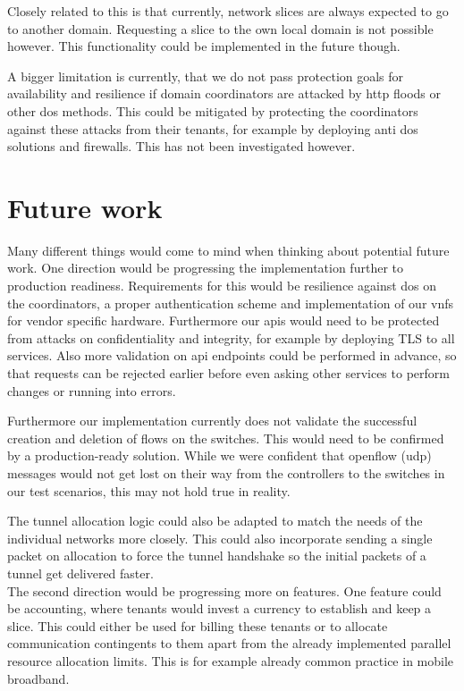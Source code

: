 Closely related to this is that currently, network slices are always expected to go to another domain. Requesting a slice to the own local domain is not possible however. This functionality could be implemented in the future though.

A bigger limitation is currently, that we do not pass protection goals for availability and resilience if domain coordinators are attacked by \acrshort{http} floods or other \acrshort{dos} methods. This could be mitigated by protecting the coordinators against these attacks from their tenants, for example by deploying anti \acrshort{dos} solutions and firewalls. This has not been investigated however.


\section{Future work}
Many different things would come to mind when thinking about potential future work. One direction would be progressing the implementation further to production readiness. Requirements for this would be resilience against \acrshort{dos} on the coordinators, a proper authentication scheme and implementation of our \acrshort{vnf}s for vendor specific hardware. Furthermore our \acrshort{api}s would need to be protected from attacks on confidentiality and integrity, for example by deploying TLS to all services. Also more validation on \acrshort{api} endpoints could be performed in advance, so that requests can be rejected earlier before even asking other services to perform changes or running into errors.

Furthermore our implementation currently does not validate the successful creation and deletion of flows on the switches. This would need to be confirmed by a production-ready solution. While we were confident that \Gls{openflow} (\acrshort{udp}) messages would not get lost on their way from the controllers to the switches in our test scenarios, this may not hold true in reality.

The tunnel allocation logic could also be adapted to match the needs of the individual networks more closely. This could also incorporate sending a single packet on allocation to force the tunnel handshake so the initial packets of a tunnel get delivered faster.\\

The second direction would be progressing more on features. One feature could be accounting, where tenants would invest a currency to establish and keep a slice. This could either be used for billing these tenants or to allocate communication contingents to them apart from the already implemented parallel resource allocation limits. This is for example already common practice in mobile broadband.

